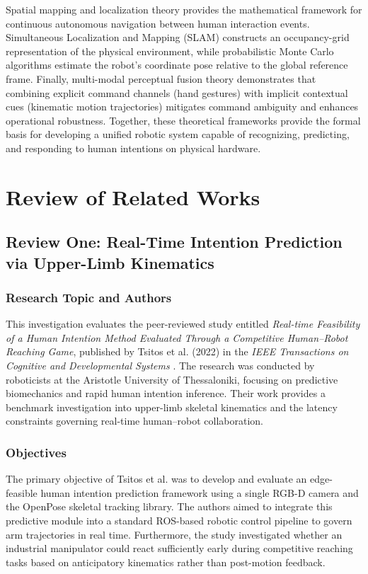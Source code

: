 Spatial mapping and localization theory provides the mathematical framework for continuous autonomous navigation between human interaction events. Simultaneous Localization and Mapping (SLAM) constructs an occupancy-grid representation of the physical environment, while probabilistic Monte Carlo algorithms estimate the robot's coordinate pose relative to the global reference frame. Finally, multi-modal perceptual fusion theory demonstrates that combining explicit command channels (hand gestures) with implicit contextual cues (kinematic motion trajectories) mitigates command ambiguity and enhances operational robustness. Together, these theoretical frameworks provide the formal basis for developing a unified robotic system capable of recognizing, predicting, and responding to human intentions on physical hardware.

\section{Review of Related Works}

\subsection{Review One: Real-Time Intention Prediction via Upper-Limb Kinematics}

\subsubsection{Research Topic and Authors}
This investigation evaluates the peer-reviewed study entitled \textit{Real-time Feasibility of a Human Intention Method Evaluated Through a Competitive Human--Robot Reaching Game}, published by Tsitos et al. (2022) in the \textit{IEEE Transactions on Cognitive and Developmental Systems} \cite{tsitos2022}. The research was conducted by roboticists at the Aristotle University of Thessaloniki, focusing on predictive biomechanics and rapid human intention inference. Their work provides a benchmark investigation into upper-limb skeletal kinematics and the latency constraints governing real-time human--robot collaboration.

\subsubsection{Objectives}
The primary objective of Tsitos et al. was to develop and evaluate an edge-feasible human intention prediction framework using a single RGB-D camera and the OpenPose skeletal tracking library. The authors aimed to integrate this predictive module into a standard ROS-based robotic control pipeline to govern arm trajectories in real time. Furthermore, the study investigated whether an industrial manipulator could react sufficiently early during competitive reaching tasks based on anticipatory kinematics rather than post-motion feedback.

